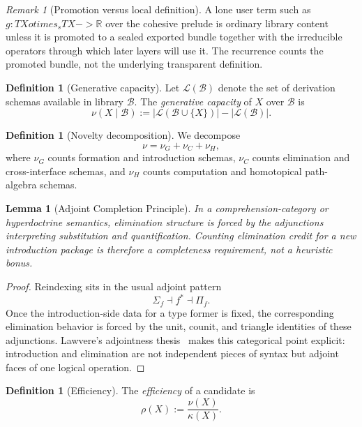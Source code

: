 \documentclass[11pt,a4paper]{article}
\def\to{->}%
\def\otimes{otimes}%
\theoremstyle{plain}
\newtheorem{lemma}[theorem]{Lemma}
\theoremstyle{definition}
\newtheorem{definition}[theorem]{Definition}
\theoremstyle{remark}
\newtheorem{remark}[theorem]{Remark}
\newcommand{\R}{\mathbb{R}}
\newcommand{\B}{\mathcal{B}}
\newcommand{\Lcal}{\mathcal{L}}
\begin{document}
\begin{remark}[Promotion versus local definition]
\label{rem:promotion-local}
A lone user term such as $g:TX\otimes_s TX\to\R$ over the cohesive prelude is ordinary library content unless it is promoted to a sealed exported bundle together with the irreducible operators through which later layers will use it.  The recurrence counts the promoted bundle, not the underlying transparent definition.
\end{remark}

\begin{definition}[Generative capacity]
\label{def:novelty}
Let $\Lcal(\B)$ denote the set of derivation schemas available in library $\B$.  The \emph{generative capacity} of $X$ over $\B$ is
\[
  \nu(X\mid\B):=|\Lcal(\B\cup\{X\})|-|\Lcal(\B)|.
\]
\end{definition}

\begin{definition}[Novelty decomposition]
\label{def:components}
We decompose
\[
  \nu=\nu_G+\nu_C+\nu_H,
\]
where $\nu_G$ counts formation and introduction schemas, $\nu_C$ counts elimination and cross-interface schemas, and $\nu_H$ counts computation and homotopical path-algebra schemas.
\end{definition}

\begin{lemma}[Adjoint Completion Principle]
\label{lem:adjoint-completion}
In a comprehension-category or hyperdoctrine semantics, elimination structure is forced by the adjunctions interpreting substitution and quantification.  Counting elimination credit for a new introduction package is therefore a completeness requirement, not a heuristic bonus.
\end{lemma}

\begin{proof}
Reindexing sits in the usual adjoint pattern
\[
  \Sigma_f \dashv f^* \dashv \Pi_f.
\]
Once the introduction-side data for a type former is fixed, the corresponding elimination behavior is forced by the unit, counit, and triangle identities of these adjunctions.  Lawvere's adjointness thesis~\cite{lawvere-adjoint} makes this categorical point explicit: introduction and elimination are not independent pieces of syntax but adjoint faces of one logical operation.
\end{proof}

\begin{definition}[Efficiency]
\label{def:efficiency}
The \emph{efficiency} of a candidate is
\[
  \rho(X):=\frac{\nu(X)}{\kappa(X)}.
\]
\end{definition}
\end{document}
